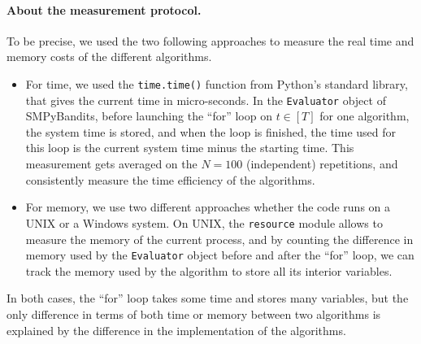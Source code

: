 \paragraph{About the measurement protocol.}
%
To be precise, we used the two following approaches to measure the real time and memory costs of the different algorithms.
\begin{itemize}
    \item For time, we used the \texttt{time.time()} function from Python's standard library, that gives the current time in micro-seconds.
    In the \texttt{Evaluator} object of SMPyBandits, before launching the ``for'' loop on $t\in[T]$ for one algorithm, the system time is stored, and when the loop is finished, the time used for this loop is the current system time minus the starting time.
    This measurement gets averaged on the $N=100$ (independent) repetitions, and consistently measure the time efficiency of the algorithms.
    \item For memory, we use two different approaches whether the code runs on a UNIX or a Windows system.
    On UNIX, the \texttt{resource} module allows to measure the memory of the current process, and by counting the difference in memory used by the \texttt{Evaluator} object before and after the ``for'' loop, we can track the memory used by the algorithm to store all its interior variables.
\end{itemize}
In both cases, the ``for'' loop takes some time and stores many variables, but the only difference in terms of both time or memory between two algorithms is explained by the difference in the implementation of the algorithms.




